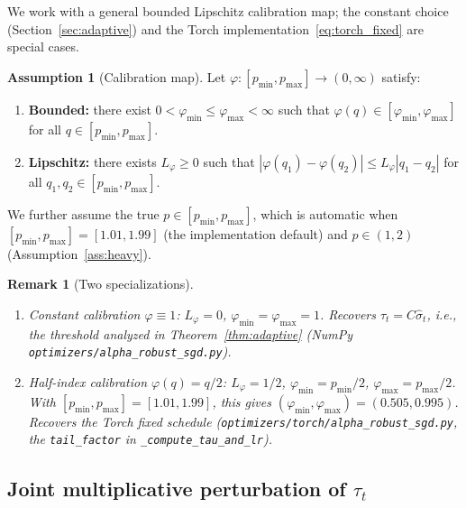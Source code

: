 \documentclass[11pt]{article}
\newtheorem{remark}[theorem]{Remark}
\theoremstyle{definition}
\newtheorem{assumption}{Assumption}
\newcommand{\abs}[1]{\left| #1 \right|}
\newcommand{\shat}{\hat{\sigma}}
\begin{document}
We work with a general bounded Lipschitz calibration map; the constant
choice (Section~\ref{sec:adaptive}) and the Torch
implementation~\eqref{eq:torch_fixed} are special cases.

\begin{assumption}[Calibration map]\label{ass:phi}
Let $\varphi \colon [p_{\min}, p_{\max}] \to (0, \infty)$ satisfy:
\begin{enumerate}[label=(\roman*),noitemsep]
  \item \textbf{Bounded:} there exist $0 < \varphi_{\min} \leq \varphi_{\max} < \infty$
    such that $\varphi(q) \in [\varphi_{\min}, \varphi_{\max}]$ for all
    $q \in [p_{\min}, p_{\max}]$.
  \item \textbf{Lipschitz:} there exists $L_\varphi \geq 0$ such that
    $\abs{\varphi(q_1) - \varphi(q_2)} \leq L_\varphi \abs{q_1 - q_2}$
    for all $q_1, q_2 \in [p_{\min}, p_{\max}]$.
\end{enumerate}
We further assume the true $p \in [p_{\min}, p_{\max}]$, which is automatic
when $[p_{\min}, p_{\max}] = [1.01, 1.99]$ (the implementation default) and
$p \in (1, 2)$ (Assumption~\ref{ass:heavy}).
\end{assumption}

\begin{remark}[Two specializations]\label{rem:phi_specials}
\begin{enumerate}[label=(\alph*),noitemsep,leftmargin=*]
  \item \emph{Constant calibration} $\varphi \equiv 1$: $L_\varphi = 0$,
    $\varphi_{\min} = \varphi_{\max} = 1$. Recovers $\tau_t = C\shat_t$, i.e.,
    the threshold analyzed in Theorem~\ref{thm:adaptive} (NumPy
    \texttt{optimizers/alpha\_robust\_sgd.py}).
  \item \emph{Half-index calibration} $\varphi(q) = q/2$:
    $L_\varphi = 1/2$, $\varphi_{\min} = p_{\min}/2$, $\varphi_{\max} = p_{\max}/2$.
    With $[p_{\min}, p_{\max}] = [1.01, 1.99]$, this gives
    $(\varphi_{\min}, \varphi_{\max}) = (0.505, 0.995)$. Recovers the Torch
    fixed schedule (\texttt{optimizers/torch/alpha\_robust\_sgd.py}, the
    \texttt{tail\_factor} in \texttt{\_compute\_tau\_and\_lr}).
\end{enumerate}
\end{remark}

\subsection{Joint multiplicative perturbation of \texorpdfstring{$\tau_t$}{the threshold}}
\label{ssec:joint}
\end{document}
